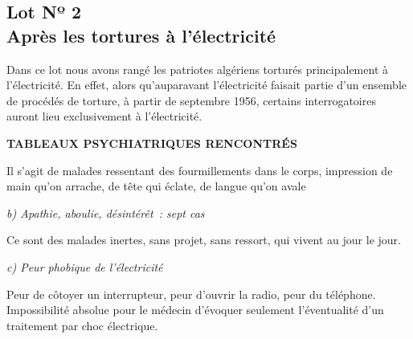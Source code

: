 \documentclass[french,twoside]{book} %
\begin{document}
\subsection[{Lot Nº 2. Après les tortures à l’électricité}]{Lot Nº 2 \\
Après les tortures à l’électricité}
\noindent Dans ce lot nous avons rangé les patriotes algériens torturés principalement à l’électricité. En effet, alors qu’auparavant l’électricité faisait partie d’un ensemble de procédés de torture, à partir de septembre 1956, certains interrogatoires auront lieu exclusivement à l’électricité.\par
\bigbreak

\begin{center}
\noindent \textbf{TABLEAUX PSYCHIATRIQUES RENCONTRÉS}\par
\end{center}

\bigbreak
{}\par
Il s’agit de malades ressentant des fourmillements dans le corps, impression de main qu’on arrache, de tête qui éclate, de langue qu’on avale\par
\bigbreak
\noindent \emph{b) Apathie, aboulie, désintérêt : sept cas}\par
Ce sont des malades inertes, sans projet, sans ressort, qui vivent au jour le jour.\par
 \bigbreak
\noindent \emph{c) Peur phobique de l’électricité}\par
Peur de côtoyer un interrupteur, peur d’ouvrir la radio, peur du téléphone. Impossibilité absolue pour le médecin d’évoquer seulement l’éventualité d’un traitement par choc électrique.
\end{document}
